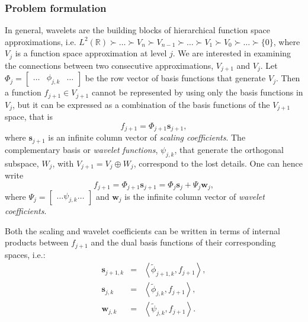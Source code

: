 \documentclass[graybox]{svmult}
\begin{document}
	\subsubsection{Problem formulation}
	In general, wavelets are the building blocks of hierarchical function space approximations, i.e. $L^2(\mathbb{R}) \succ \ldots \succ V_n \succ V_{n-1} \succ \ldots \succ V_{1} \succ V_{0} \succ \ldots \succ \{0\}$, where $V_{j}$ is a function space approximation at level $j$. We are interested in examining the connections between two consecutive approximations, $V_{j+1}$ and $V_{j}$. Let $\Phi_j = \begin{bmatrix} \ldots & \phi_{j,k} & \ldots \end{bmatrix}$ be the row vector of basis functions that generate $V_j$. Then a function $f_{j+1} \in V_{j+1}$ cannot be represented by using only the basis functions in $V_{j}$, but it can be expressed as a combination of the basis functions of the $V_{j+1}$ space, that is
	\begin{equation}
	f_{j+1} = \Phi_{j+1} \mathbf{s}_{j+1},
	\label{eq_cds:f_in_j_plus_one}
	\end{equation}
	where $\mathbf{s}_{j+1}$ is an infinite column vector of \emph{scaling coefficients}. The  complementary basis or \emph{wavelet functions}, $\psi_{j,k}$, that generate the orthogonal subspace, $W_j$, with $V_{j+1} = V_j \oplus W_j$, correspond to the lost details. One can hence write
	\begin{equation}
	f_{j+1} = \Phi_{j+1}\mathbf{s}_{j+1} = \Phi_j \mathbf{s}_j + \Psi_j \mathbf{w}_j,
	\label{eq_cds:f_in_j}
	\end{equation} 
	where $\Psi_j = \begin{bmatrix} \ldots \psi_{j,k} \ldots \end{bmatrix}$ and $\mathbf{w}_j$ is the infinite column vector of \emph{wavelet coefficients}.
	
	
	Both the scaling and wavelet coefficients can be written in terms of internal products between $f_{j+1}$ and the dual basis functions of their corresponding spaces, i.e.:
	\begin{eqnarray}
	\mathbf{s}_{j+1,k} & = & \left< \tilde{\phi}_{j+1,k}, f_{j+1} \right>,
	\label{eq_cds:inner1}\\
	\mathbf{s}_{j,k} & = & \left< \tilde{\phi}_{j,k}, f_{j+1} \right>, \label{eq_cds:inner2}\\
	\mathbf{w}_{j,k} & = & \left< \tilde{\psi}_{j,k}, f_{j+1} \right>.
	\label{eq_cds:inner3}
	\end{eqnarray}
	
\end{document}

